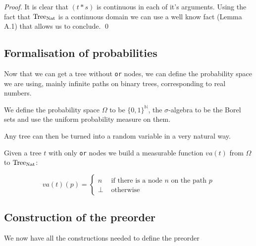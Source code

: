 \begin{proof}
    It is clear that $(t*s)$ is continuous in each of it's 
    arguments. Using the fact that $\textnormal{Tree}_{\textnormal{Nat}}$ is a 
    continuous domain we can use a well know fact 
    \cite{battenfeld2009two} (Lemma A.1) that allows us to conclude.
    \qed
\end{proof}


\subsection{Formalisation of probabilities}

Now that we can get a tree without \texttt{or} nodes,
we can define the probability space we are using, mainly 
infinite paths on binary trees, corresponding to real numbers.

\begin{adefinition}
    We define the probability space $\Omega$
    to be $\{0,1\}^\mathbb{N}$, the 
    $\sigma$-algebra to be the Borel sets 
    and use the uniform probability measure on them.
\end{adefinition}

Any tree can then be turned into a random variable in 
a very natural way. 

\begin{adefinition}
    Given a tree $t$ with only \texttt{or} nodes we 
    build a measurable function $va(t)$ from $\Omega$ to $\textnormal{Tree}_{\textnormal{Nat}}$:

    \begin{equation*}
        va(t)(p) = \begin{cases}
            n  & \text{ if there is a node } n \text{ on the path } p \\
            \bot & \text{ otherwise } 
        \end{cases}
    \end{equation*}
\end{adefinition}


\subsection{Construction of the preorder}

We now have all the constructions needed to define the preorder

